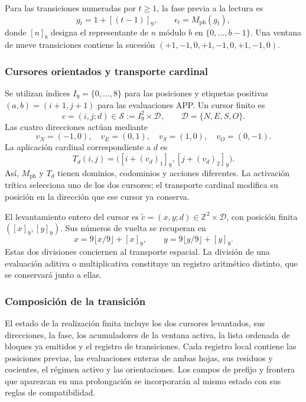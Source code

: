 Para las transiciones numeradas por \(t\geq1\), la fase previa a la lectura es
\begin{equation}
 g_t=1+[(t-1)]_9,\qquad \epsilon_t=M_{\mathrm{ph}}(g_t),
 \label{act21:tpk:fase}
\end{equation}
donde \([n]_b\) designa el representante de \(n\) módulo \(b\) en
\(\{0,\ldots,b-1\}\). Una ventana de nueve transiciones contiene la sucesión
\((+1,-1,0,+1,-1,0,+1,-1,0)\).

\subsubsection{Cursores orientados y transporte cardinal}

Se utilizan índices \(I_9=\{0,\ldots,8\}\) para las posiciones y etiquetas
positivas \((a,b)=(i+1,j+1)\) para las evaluaciones APP. Un cursor finito es
\[
 c=(i,j;d)\in\mathcal S:=I_9^2\times\mathcal D,
 \qquad \mathcal D=\{N,E,S,O\}.
\]
Las cuatro direcciones actúan mediante
\[
 v_N=(-1,0),\quad v_E=(0,1),\quad
 v_S=(1,0),\quad v_O=(0,-1).
\]
La aplicación cardinal correspondiente a \(d\) es
\[
 T_d(i,j)=\bigl([i+(v_d)_1]_9,[j+(v_d)_2]_9\bigr).
\]
Así, \(M_{\mathrm{ph}}\) y \(T_d\) tienen dominios, codominios y acciones
diferentes. La activación trítica selecciona uno de los dos cursores;
el transporte cardinal modifica su posición en la dirección que ese cursor
ya conserva.

El levantamiento entero del cursor es
\(\widetilde c=(x,y;d)\in\mathbb Z^2\times\mathcal D\), con posición finita
\(([x]_9,[y]_9)\). Sus números de vuelta se recuperan en
\begin{equation}
 x=9\lfloor x/9\rfloor+[x]_9,\qquad
 y=9\lfloor y/9\rfloor+[y]_9.
 \label{act21:tpk:vueltas}
\end{equation}
Estas dos divisiones conciernen al transporte espacial. La división de una
evaluación aditiva o multiplicativa constituye un registro aritmético
distinto, que se conservará junto a ellas.

\subsubsection{Composición de la transición}

El estado de la realización finita incluye los dos cursores levantados,
sus direcciones, la fase, los acumuladores de la ventana activa, la lista
ordenada de bloques ya emitidos y el registro de transiciones. Cada registro
local contiene las posiciones previas, las evaluaciones enteras de ambas
hojas, sus residuos y cocientes, el régimen activo y las orientaciones.
Los campos de prefijo y frontera que aparezcan en una prolongación se
incorporarán al mismo estado con sus reglas de compatibilidad.

